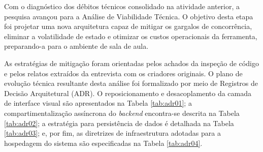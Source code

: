 Com o diagnóstico dos débitos técnicos consolidado na atividade anterior, a pesquisa avançou para a Análise de Viabilidade Técnica. O objetivo desta etapa foi projetar uma nova arquitetura capaz de mitigar os gargalos de concorrência, eliminar a volatilidade de estado e otimizar os custos operacionais da ferramenta, preparando-a para o ambiente de sala de aula.

As estratégias de mitigação foram orientadas pelos achados da inspeção de código e pelos relatos extraídos da entrevista com os criadores originais. O plano de evolução técnica resultante desta análise foi formalizado por meio de Registros de Decisão Arquitetural (ADR). O reposicionamento e desacoplamento da camada de interface visual são apresentados na Tabela \ref{tab:adr01}; a compartimentalização assíncrona do \textit{backend} encontra-se descrita na Tabela \ref{tab:adr02}; a estratégia para persistência de dados é detalhada na Tabela \ref{tab:adr03}; e, por fim, as diretrizes de infraestrutura adotadas para a hospedagem do sistema são especificadas na Tabela \ref{tab:adr04}.

